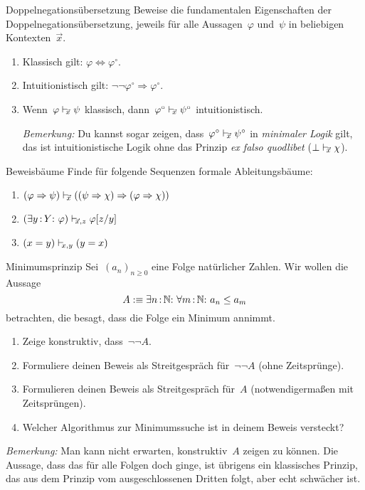 \documentclass{pizzablatt}
\begin{document}

\begin{aufgabe}{Doppelnegationsübersetzung}
Beweise die fundamentalen Eigenschaften der Doppelnegationsübersetzung, jeweils für alle
Aussagen~$\varphi$ und~$\psi$ in beliebigen Kontexten~$\vec x$.
\begin{enumerate}
\item Klassisch gilt: $\varphi \Longleftrightarrow \varphi^\circ$.
\item Intuitionistisch gilt: $\neg\neg\varphi^\circ \Longrightarrow
\varphi^\circ$.
\item Wenn~$\varphi \mathrel{\vdash\!\!\!_{\vec x}} \psi$ klassisch, dann~$\varphi^\circ \mathrel{\vdash\!\!\!_{\vec
x}} \psi^\circ$ intuitionistisch.

\emph{Bemerkung:} Du kannst sogar zeigen, dass~$\varphi^\circ \mathrel{\vdash\!\!\!_{\vec x}}
\psi^\circ$ in \emph{minimaler Logik} gilt, das ist intuitionistische Logik
ohne das Prinzip \emph{ex falso quodlibet} ($\bot \mathrel{\vdash\!\!\!_{\vec x}} \chi$).
\end{enumerate}
\end{aufgabe}

\begin{aufgabe}{Beweisbäume}
Finde für folgende Sequenzen formale Ableitungsbäume:
\begin{enumerate}
\item $(\varphi \Rightarrow \psi) \mathrel{\vdash\!\!\!_{\vec x}} ((\psi \Rightarrow \chi)
\Rightarrow (\varphi \Rightarrow \chi))$
\item $(\exists y\,{:}\,Y{:}\ \varphi) \mathrel{\vdash\!\!\!_{\vec x,z}} \varphi[z/y]$
\item $(x = y) \mathrel{\vdash\!\!\!_{x,y}} (y = x)$
\end{enumerate}
\end{aufgabe}

\begin{aufgabe}{Minimumsprinzip}
Sei~$(a_n)_{n \geq 0}$ eine Folge natürlicher Zahlen. Wir wollen die Aussage
\[ A :\equiv \exists n\?\NN{:}\ \forall m\?\NN{:}\ a_n \leq a_m \]
betrachten, die besagt, dass die Folge ein Minimum annimmt.

\begin{enumerate}
\item Zeige konstruktiv, dass~$\neg\neg A$.
\item Formuliere deinen Beweis als Streitgespräch für~$\neg\neg A$ (ohne
Zeitsprünge).
\item Formulieren deinen Beweis als Streitgespräch für~$A$ (notwendigermaßen
mit Zeitsprüngen).
\item Welcher Algorithmus zur Minimumssuche ist in deinem Beweis versteckt?
\end{enumerate}

\emph{Bemerkung:} Man kann nicht erwarten,
konstruktiv~$A$ zeigen zu können. Die Aussage, dass das für alle Folgen doch
ginge, ist übrigens ein klassisches Prinzip, das aus dem Prinzip vom
ausgeschlossenen Dritten folgt, aber echt schwächer ist.

\end{aufgabe}
\end{document}
